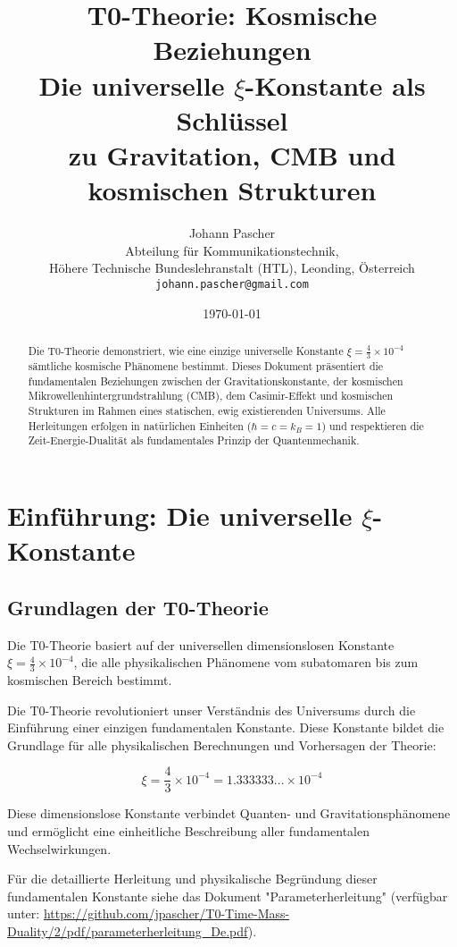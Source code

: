 \documentclass[12pt,a4paper]{article}
\title{\Huge\textbf{T0-Theorie: Kosmische Beziehungen}\\
	\Large Die universelle $\xi$-Konstante als Schlüssel \\
	zu Gravitation, CMB und kosmischen Strukturen}
\author{Johann Pascher\\
	Abteilung für Kommunikationstechnik, \\Höhere Technische Bundeslehranstalt (HTL), Leonding, Österreich\\
	\texttt{johann.pascher@gmail.com}}
\date{\today}
\begin{document}
	
	\maketitle
	
	\begin{abstract}
		Die T0-Theorie demonstriert, wie eine einzige universelle Konstante $\xi = \frac{4}{3} \times 10^{-4}$ s\"amtliche kosmische Ph\"anomene bestimmt. Dieses Dokument pr\"asentiert die fundamentalen Beziehungen zwischen der Gravitationskonstante, der kosmischen Mikrowellenhintergrundstrahlung (CMB), dem Casimir-Effekt und kosmischen Strukturen im Rahmen eines statischen, ewig existierenden Universums. Alle Herleitungen erfolgen in nat\"urlichen Einheiten ($\hbar = c = k_B = 1$) und respektieren die Zeit-Energie-Dualit\"at als fundamentales Prinzip der Quantenmechanik.
	\end{abstract}
	
	\tableofcontents
	\newpage
	
	\section{Einf\"uhrung: Die universelle $\xi$-Konstante}
	
\subsection{Grundlagen der T0-Theorie}

\begin{important}
	Die T0-Theorie basiert auf der universellen dimensionslosen Konstante $\xi = \frac{4}{3} \times 10^{-4}$, die alle physikalischen Phänomene vom subatomaren bis zum kosmischen Bereich bestimmt.
\end{important}

Die T0-Theorie revolutioniert unser Verständnis des Universums durch die Einführung einer einzigen fundamentalen Konstante. Diese Konstante bildet die Grundlage für alle physikalischen Berechnungen und Vorhersagen der Theorie:

\begin{equation}
	\xi = \frac{4}{3} \times 10^{-4} = 1.333333... \times 10^{-4}
\end{equation}

Diese dimensionslose Konstante verbindet Quanten- und Gravitationsphänomene und ermöglicht eine einheitliche Beschreibung aller fundamentalen Wechselwirkungen.

\begin{tcolorbox}[colback=yellow!10!white,colframe=yellow!50!black,title=Hinweis zur Herleitung]
	Für die detaillierte Herleitung und physikalische Begründung dieser fundamentalen Konstante siehe das Dokument "Parameterherleitung" (verfügbar unter: \url{https://github.com/jpascher/T0-Time-Mass-Duality/2/pdf/parameterherleitung_De.pdf}).
\end{tcolorbox}
\end{document}
